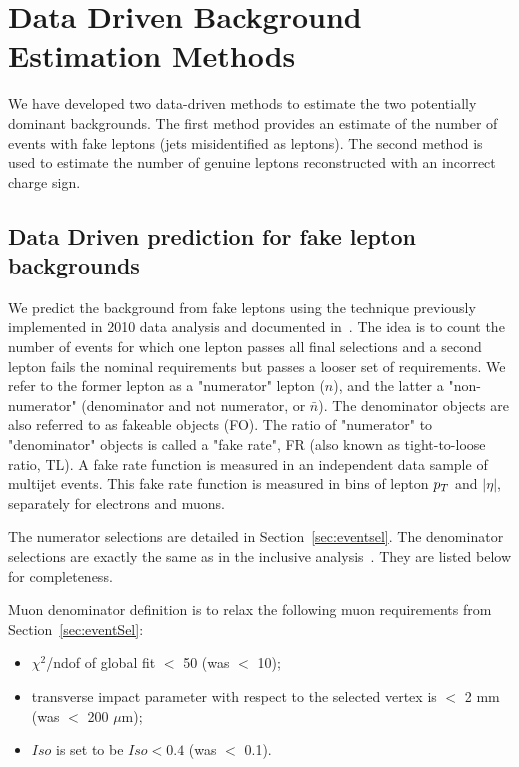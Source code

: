 \section{Data Driven Background Estimation Methods}
\label{sec:datadriven}

We have developed two data-driven methods to 
estimate the two potentially dominant backgrounds.
The first method provides an estimate of the number of events with fake leptons (jets misidentified as leptons).
The second method is used to estimate the number of genuine leptons reconstructed with an incorrect charge sign.

\subsection{Data Driven prediction for fake lepton backgrounds}
\label{sec:fakes}

We predict the background from fake leptons using the technique previously implemented in 2010 data analysis
and documented in~\cite{frmethod}.
The idea is to count the number of events for which one lepton passes all final selections and a second lepton
fails the nominal requirements but passes a looser set of requirements. 
We refer to the former lepton as a "numerator" lepton ($n$),
and the latter a "non-numerator" (denominator and not numerator, or $\bar{n}$).
The denominator objects are also referred to as fakeable objects (FO).
The ratio of "numerator" to "denominator" objects is called a "fake rate",
 FR (also known as tight-to-loose ratio, TL).  
A fake rate function is measured in an independent data sample of multijet events.
This fake rate function is measured in bins of lepton $p_T$ and $|\eta |$,
separately for electrons and muons. 

The numerator selections are detailed in Section~\ref{sec:eventsel}. 
The denominator selections are exactly the same as in the inclusive analysis~\cite{ssnote2011}.
They are listed below for completeness.

Muon denominator definition is to relax the following muon requirements from
Section~\ref{sec:eventSel}:
\begin{itemize}
\item $\chi^2$/ndof of global fit $<$ 50 (was $<$ 10);
\item transverse impact parameter with respect to the selected vertex is
$<$ 2 mm (was $<$ 200 $\mu$m);
\item $Iso$ is set to be $Iso < 0.4$  (was $<$ 0.1).
\end{itemize}

